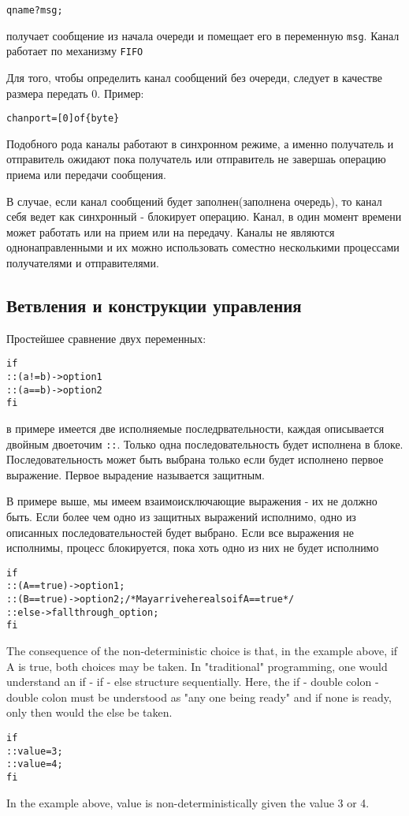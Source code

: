 \documentclass[12pt, twoside]{report}
\begin{document}
\begin{alltt}
qname ? msg;
\end{alltt}

получает сообщение из начала очереди и помещает его в переменную \texttt{msg}.
Канал работает по механизму \texttt{FIFO}

Для того, чтобы определить канал сообщений без очереди, следует в качестве размера передать 0.
Пример:

\begin{alltt}
chan port = [0] of \{byte\}
\end{alltt}

Подобного рода каналы работают в синхронном режиме, а именно получатель и отправитель ожидают
пока получатель или отправитель не завершаь операцию приема или передачи сообщения.

В случае, если канал сообщений будет заполнен(заполнена очередь), то канал себя ведет как синхронный
- блокирует операцию. Канал, в один момент времени может работать или на прием или на передачу.
Каналы не являются однонаправленными и их можно использовать соместно несколькими процессами
получателями и отправителями.

\subsection*{Ветвления и конструкции управления}\label{promela_language_IF}

Простейшее сравнение двух переменных:

\begin{alltt}
if
:: ( a != b ) -> option1
:: ( a == b ) -> option2
fi
\end{alltt}

в примере имеется две исполняемые последрвательности, каждая описывается
двойным двоеточим \texttt{::}. Только одна последовательность будет исполнена
в блоке. Последовательность может быть выбрана только если будет
исполнено первое выражение. Первое вырадение называется защитным.

В примере выше, мы имеем взаимоисключающие выражения - их не должно быть.
Если более чем одно из защитных выражений исполнимо, одно из описанных последовательностей
будет выбрано. Если все выражения не исполнимы, процесс блокируется, пока хоть одно из них не будет исполнимо

\begin{alltt}
if
:: (A == true) -> option1;
:: (B == true) -> option2; /* May arrive here also if A==true */
:: else -> fallthrough_option;
fi
\end{alltt}
The consequence of the non-deterministic choice is that, in the example above, if A is true,
both choices may be taken. In "traditional" programming, one would understand an
if - if - else structure sequentially. Here, the if - double colon - double colon must be
understood as "any one being ready" and if none is ready, only then would the else be taken.
\begin{alltt}
if
:: value = 3;
:: value = 4;
fi
\end{alltt}
In the example above, value is non-deterministically given the value 3 or 4.
\end{document}
